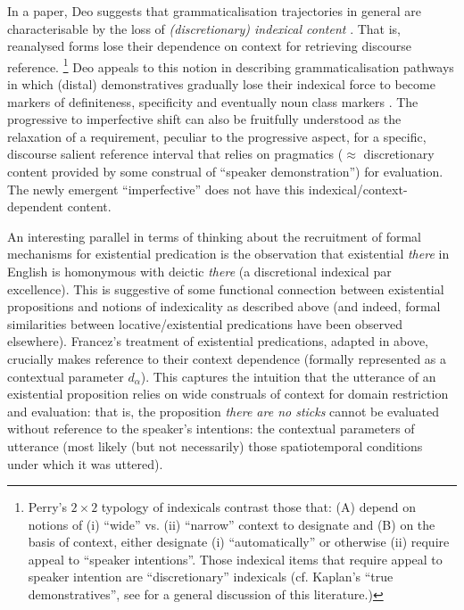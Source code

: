 \documentclass[output=paper,draft,draftmode,colorlinks,citecolor=brown]{langscibook}
\begin{document}
In a \citeyear{Deo2018} paper, Deo suggests that grammaticalisation
trajectories in general are characterisable by the loss of
\textit{(discretionary) indexical content} \citep[e.g.][68ff]{Perry2012}.
That is, reanalysed forms lose their dependence on context for retrieving
discourse reference.%
%
\footnote{Perry's \citeyearpar[68ff]{Perry2012} $2\times 2${} typology of indexicals contrast those that: (A) depend on notions of (i) ``wide'' vs. (ii) ``narrow'' context to designate and (B) on the basis of context, either designate (i) ``automatically'' or otherwise (ii) require appeal to ``speaker intentions''. Those indexical items that require appeal to speaker intention are ``discretionary'' indexicals (cf. Kaplan's ``true demonstratives'', see \cite{Braun2017} for a general discussion of this literature.)} 
%
Deo appeals to this notion in describing grammaticalisation pathways in which (distal) demonstratives gradually lose their indexical force to become markers of definiteness, specificity and eventually noun class markers \citep[see also][61]{Greenberg1978,deMulder2011,Stevens2007}. The progressive to imperfective shift can also be fruitfully understood as the relaxation of a requirement, peculiar to the progressive aspect, for a specific, discourse salient reference interval that relies on pragmatics ($\approx$ discretionary content provided by some construal of ``speaker demonstration'') for evaluation. The newly emergent ``imperfective'' does not have this indexical\slash context-dependent content.

An interesting parallel in terms of thinking about the recruitment of
formal mechanisms for existential predication is the observation that
existential \textit{there} in English is homonymous with deictic
\textit{there} (a discretional indexical par excellence). This is
suggestive of some functional connection between existential propositions
and notions of indexicality as described above (and indeed, formal
similarities between locative\slash existential predications have been
observed elsewhere). Francez's \citeyear{Francez2007} treatment of
existential predications, adapted in
 above, crucially makes
reference to their context dependence (formally represented as a contextual
parameter $d_\alpha$). This captures the intuition that the utterance of an existential proposition relies on wide construals of context for domain restriction and evaluation: that is, the proposition \textit{there are no sticks} cannot be evaluated without reference to the speaker's intentions: the contextual parameters of utterance (most likely (but not necessarily) those spatiotemporal conditions under which it was uttered). 
\end{document}
